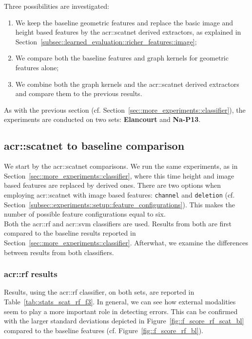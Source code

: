     Three possibilities are investigated:
    \begin{enumerate}[label=\roman*)]
        \item We keep the baseline geometric features and replace the basic image and height based features by the \gls{acr::scatnet} derived extractors, as explained in Section~\ref{subsec::learned_evaluation::richer_features::image};
        \item We compare both the baseline features and graph kernels for geometric features alone;
        \item We combine both the graph kernels and the \gls{acr::scatnet} derived extractors and compare them to the previous results.
    \end{enumerate}
    As with the previous section (cf. Section~\ref{sec::more_experiments::classifier}), the experiments are conducted on two sets: \textbf{Elancourt} and \textbf{Na-P13}.

    \subsection{\texorpdfstring{\acrshort*{acr::scatnet}}{ScatNet} to baseline comparison}
        \label{subsec::more_experiments::richer_features::scatnet_baseline}
        We start by the \gls{acr::scatnet} comparisons.
        We run the same experiments, as in Section~\ref{sec::more_experiments::classifier}, where this time height and image based features are replaced by derived ones.
        There are two options when employing \gls{acr::scatnet} with image based features: \texttt{channel} and \texttt{deletion} (cf. Section~\ref{subsec::experiments::setup::feature_configurations}).
        This makes the number of possible feature configurations equal to six.\\

        Both the \gls{acr::rf} and \gls{acr::svm} classifiers are used.
        Results from both are first compared to the baseline results reported in Section~\ref{sec::more_experiments::classifier}.
        Afterwhat, we examine the differences between results from both classifiers.

        \subsubsection{\texorpdfstring{\acrshort*{acr::rf}}{RF} results}
            \label{subsubsec::more_experiments::richer_features::scatnet_baseline::rf}
            Results, using the \gls{acr::rf} classifier, on both sets, are reported in Table~\ref{tab::stats_scat_rf_f3}.
            In general, we can see how external modalities seem to play a more important role in detecting errors.
            This can be confirmed with the larger standard deviations depicted in Figure~\ref{fig::f_score_rf_scat_bl} compared to the baseline features (cf. Figure~\ref{fig::f_score_rf_bl}).\\

